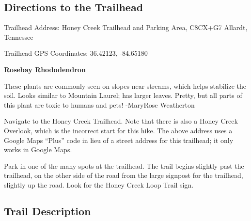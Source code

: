 \documentclass[
  letterpaper,
  DIV=11,
  numbers=noendperiod]{scrreprt}
\begin{document}
\subsection{Directions to the
Trailhead}\label{directions-to-the-trailhead-18}

Trailhead Address: Honey Creek Trailhead and Parking Area, C8CX+G7
Allardt, Tennessee

Trailhead GPS Coordinates: 36.42123, -84.65180

\begin{tcolorbox}[enhanced jigsaw, opacityback=0, bottomrule=.15mm, colframe=quarto-callout-note-color-frame, breakable, arc=.35mm, leftrule=.75mm, rightrule=.15mm, toprule=.15mm, left=2mm, colback=white]
\begin{minipage}[t]{5.5mm}
\textcolor{quarto-callout-note-color}{\faInfo}
\end{minipage}%
\begin{minipage}[t]{\textwidth - 5.5mm}

\vspace{-3mm}\textbf{Rosebay Rhododendron}\vspace{3mm}

These plants are commonly seen on slopes near streams, which helps
stabilize the soil. Looks similar to Mountain Laurel; has larger leaves.
Pretty, but all parts of this plant are toxic to humans and pets!
-MaryRose Weatherton

\end{minipage}%
\end{tcolorbox}

Navigate to the Honey Creek Trailhead. Note that there is also a Honey
Creek Overlook, which is the incorrect start for this hike. The above
address uses a Google Maps ``Plus'' code in lieu of a street address for
this trailhead; it only works in Google Maps.

Park in one of the many spots at the trailhead. The trail begins
slightly past the trailhead, on the other side of the road from the
large signpost for the trailhead, slightly up the road. Look for the
Honey Creek Loop Trail sign.

\subsection{Trail Description}\label{trail-description-18}
\end{document}
